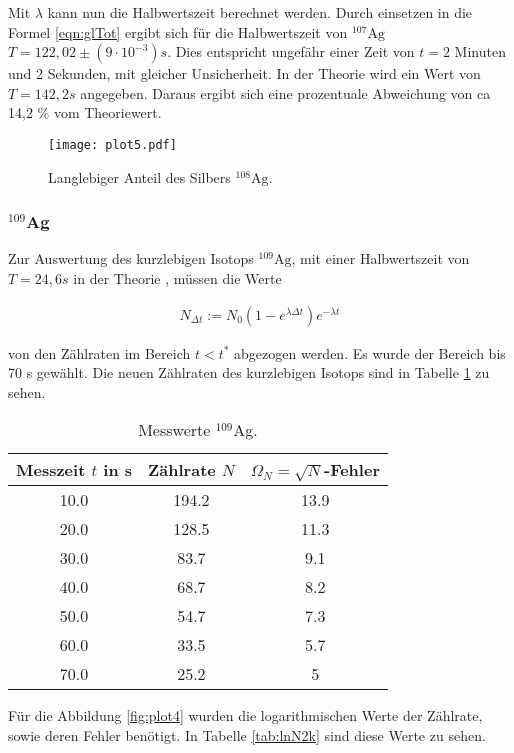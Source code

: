 Mit $\lambda$ kann nun die Halbwertszeit berechnet werden.
Durch einsetzen in die Formel \ref{eqn:glTot} ergibt sich für die Halbwertszeit von $^{107}\text{Ag}$ $T = 122,02 \pm (9 \cdot 10^{-3}) s$.
Dies entspricht ungefähr einer Zeit von $t = 2$ Minuten und 2 Sekunden, mit gleicher Unsicherheit.
In der Theorie wird ein Wert von $T = 142,2 s$ \cite{Periode} angegeben.
Daraus ergibt sich eine prozentuale Abweichung von ca 14,2 \% vom Theoriewert.

\begin{figure}
  \centering
  \texttt{[image: plot5.pdf]}
  \caption{Langlebiger Anteil des Silbers $^{108}\text{Ag}$.}
  \label{fig:plot3}
\end{figure}
\FloatBarrier

\subsubsection{$^{109}$Ag}

Zur Auswertung des kurzlebigen Isotops $^{109}\text{Ag}$, mit einer Halbwertszeit von $T = 24,6 s$ in der Theorie \cite{Periode}, müssen die Werte 

\begin{align*}
  N_{\Delta t} := N_0(1-e^{\lambda \Delta t})e^{-\lambda t}
\end{align*}

von den Zählraten im Bereich $t < t^*$ abgezogen werden.
Es wurde der Bereich bis 70 s gewählt.
Die neuen Zählraten des kurzlebigen Isotops sind in Tabelle \ref{tab:Nk} zu sehen. 

\begin{table}
  \centering
  \caption{Messwerte $^{109}$Ag.}
  \label{tab:Nk}
\begin{tabular}{c c c}
  \toprule
  Messzeit $t$ in s & Zählrate $N$ & $\Omega_N = \sqrt{N}$-Fehler\\
  \midrule
  10.0 & 194.2 & 13.9\\
  20.0 & 128.5 & 11.3 \\
  30.0 & 83.7 & 9.1 \\
  40.0 & 68.7 & 8.2 \\
  50.0 & 54.7 & 7.3 \\
  60.0 & 33.5 & 5.7 \\
  70.0 & 25.2 & 5 \\
  \bottomrule
\end{tabular}
\end{table}
\FloatBarrier

Für die Abbildung \ref{fig:plot4} wurden die logarithmischen Werte der Zählrate, sowie deren Fehler benötigt.
In Tabelle \ref{tab:lnN2k} sind diese Werte zu sehen.

